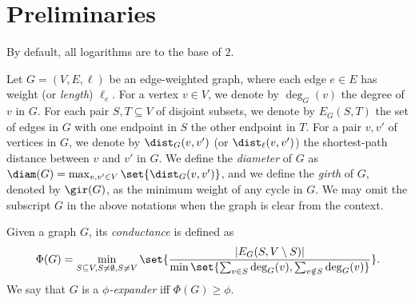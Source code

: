 \section{Preliminaries}

By default, all logarithms are to the base of $2$. 

Let $G=(V,E,\ell)$ be an edge-weighted graph, where each edge $e\in E$ has weight (or \emph{length}) $\ell_e$. 
For a vertex $v\in V$, we denote by $\deg_G(v)$ the degree of $v$ in $G$.
For each pair $S,T\subseteq V$ of disjoint subsets, we denote by $E_{G}(S,T)$ the set of edges in $G$ with one endpoint in $S$ the other endpoint in $T$.
For a pair $v,v'$ of vertices in $G$, we denote by $\dist_{G}(v,v')$ (or $\dist_{\ell}(v,v')$) the shortest-path distance between $v$ and $v'$ in $G$.
We define the \emph{diameter} of $G$ as $\diam(G)=\max_{v,v'\in V}\set{\dist_G(v,v')}$, and we define the \emph{girth} of $G$, denoted by $\gir(G)$, as the minimum weight of any cycle in $G$.
We may omit the subscript $G$ in the above notations when the graph is clear from the context.


Given a graph $G$, its \emph{conductance} 
is defined as 
\[\Phi(G)=\min_{S\subseteq V, S \ne\emptyset, S\ne V}
\set{
\frac{|E_{G}(S,V\setminus S)|}
{\min\set{\sum_{v\in S}\deg_G(v),\sum_{v\notin S}\deg_G(v)}}
	}.\]
We say that $G$ is a \emph{$\phi$-expander} iff $\Phi(G)\ge\phi$. 


